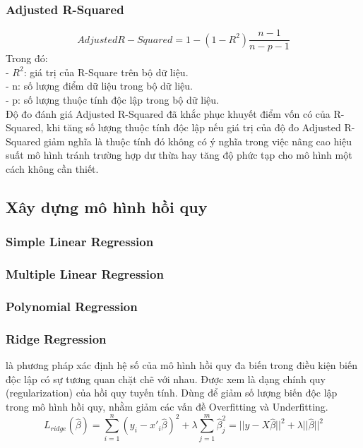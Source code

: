 \documentclass[runningheads]{llncs}
\begin{document}
\subsubsection{Adjusted R-Squared}
\begin{equation}
	Adjusted  R-Squared = 1- (1-R^2)\frac{n-1}{n-p-1}
\end{equation}
Trong đó: \\
- $R^2$: giá trị của R-Square trên bộ dữ liệu.\\
- n: số lượng điểm dữ liệu trong bộ dữ liệu.\\
- p: số lượng thuộc tính độc lập trong bộ dữ liệu.\\

 Độ đo đánh giá Adjusted R-Squared đã khắc phục khuyết điểm vốn có của R-Squared, khi tăng số lượng thuộc tính độc lập nếu giá trị của độ đo Adjusted R-Squared giảm nghĩa là thuộc tính đó không có ý nghĩa trong việc nâng cao hiệu suất mô hình tránh trường hợp dư thừa hay tăng độ phức tạp cho mô hình một cách không cần thiết.


\subsection{Xây dựng mô hình hồi quy}
\subsubsection{Simple Linear Regression}
\subsubsection{Multiple Linear Regression}
\subsubsection{Polynomial Regression}

\subsubsection{Ridge Regression}
là phương pháp xác định hệ số của mô hình hồi quy đa biến trong điều kiện biến độc lập có sự tương quan chặt chẽ với nhau. Được xem là dạng chính quy (regularization) của hồi quy tuyến tính. Dùng để giảm số lượng biến độc lập trong mô hình hồi quy, nhằm giảm các vấn đề Overfitting và Underfitting.
	\begin{equation}
	L_{ridge}(\hat{\beta})=\sum^{n}_{i=1}{(y_i-x'_i\hat{\beta})^2}+\lambda\sum^{m}_{j=1}{\hat{\beta}^2_j}=||y-X\hat{\beta}||^2+\lambda||\hat{\beta}||^2
	\end{equation}
\end{document}
